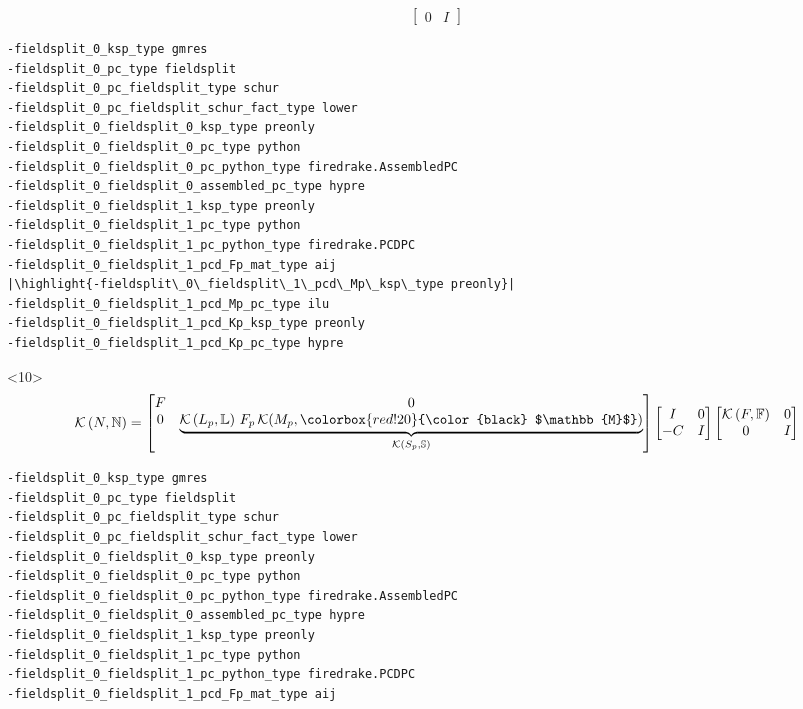 \documentclass[presentation]{beamer}
\newcommand{\KSP}[2]{\ensuremath{\mathcal{K}\left(#1, \mathbb{#2}\right)}}
\newcommand{\ksp}[1]{\KSP{#1}{#1}}
\newcommand{\highlight}[1]{\colorbox{red!20}{\color{black} #1}}
\begin{document}
\begin{frame}[fragile]
\begin{onlyenv}
\begin{equation*}
\begin{bmatrix}
        0 & I
      \end{bmatrix}
    \end{equation*}
\begin{verbatim}
-fieldsplit_0_ksp_type gmres
-fieldsplit_0_pc_type fieldsplit
-fieldsplit_0_pc_fieldsplit_type schur
-fieldsplit_0_pc_fieldsplit_schur_fact_type lower
-fieldsplit_0_fieldsplit_0_ksp_type preonly
-fieldsplit_0_fieldsplit_0_pc_type python
-fieldsplit_0_fieldsplit_0_pc_python_type firedrake.AssembledPC
-fieldsplit_0_fieldsplit_0_assembled_pc_type hypre
-fieldsplit_0_fieldsplit_1_ksp_type preonly
-fieldsplit_0_fieldsplit_1_pc_type python
-fieldsplit_0_fieldsplit_1_pc_python_type firedrake.PCDPC
-fieldsplit_0_fieldsplit_1_pcd_Fp_mat_type aij
|\highlight{-fieldsplit\_0\_fieldsplit\_1\_pcd\_Mp\_ksp\_type preonly}|
-fieldsplit_0_fieldsplit_1_pcd_Mp_pc_type ilu
-fieldsplit_0_fieldsplit_1_pcd_Kp_ksp_type preonly
-fieldsplit_0_fieldsplit_1_pcd_Kp_pc_type hypre
\end{verbatim}
  \end{onlyenv}
  \begin{onlyenv}<10>
    \color{gray}
    \begin{equation*}
      \ksp{N} = \begin{bmatrix}
        F & 0 \\
        0 & \underbrace{\KSP{L_p}{L}\,F_p \, \mathcal{K}(M_p, \highlight{$\mathbb{M}$})}_{\KSP{S_p}{S}}
      \end{bmatrix}
      \begin{bmatrix}
        I & 0\\
        -C & I
      \end{bmatrix}
      \begin{bmatrix}
        \ksp{F} & 0 \\
        0 & I
      \end{bmatrix}
    \end{equation*}
\begin{verbatim}
-fieldsplit_0_ksp_type gmres
-fieldsplit_0_pc_type fieldsplit
-fieldsplit_0_pc_fieldsplit_type schur
-fieldsplit_0_pc_fieldsplit_schur_fact_type lower
-fieldsplit_0_fieldsplit_0_ksp_type preonly
-fieldsplit_0_fieldsplit_0_pc_type python
-fieldsplit_0_fieldsplit_0_pc_python_type firedrake.AssembledPC
-fieldsplit_0_fieldsplit_0_assembled_pc_type hypre
-fieldsplit_0_fieldsplit_1_ksp_type preonly
-fieldsplit_0_fieldsplit_1_pc_type python
-fieldsplit_0_fieldsplit_1_pc_python_type firedrake.PCDPC
-fieldsplit_0_fieldsplit_1_pcd_Fp_mat_type aij

\end{verbatim}
\end{onlyenv}
\end{frame}
\end{document}
